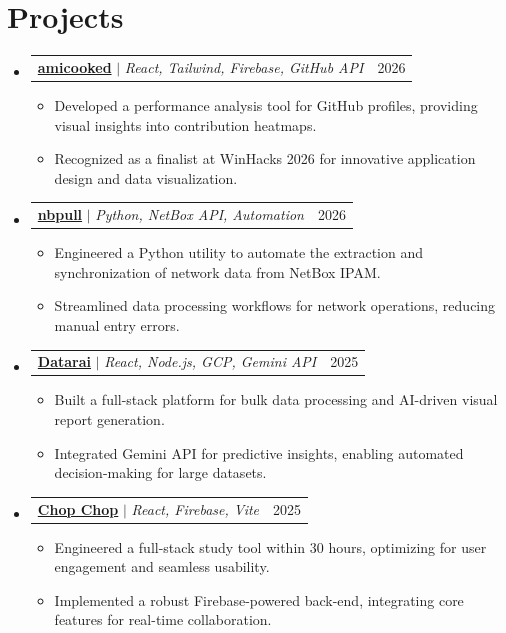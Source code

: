 \documentclass[letterpaper,11pt]{article}
\makeatletter
\newcommand{\resumeItem}[1]{
  \item\small{
    {#1 \vspace{-2pt}}
  }
}
\newcommand{\resumeProjectHeading}[2]{
    \item
    \begin{tabular*}{0.97\textwidth}{l@{\extracolsep{\fill}}r}
      \small#1 & #2 \\
    \end{tabular*}\vspace{-7pt}
}
\newcommand{\resumeSubHeadingListStart}{\begin{itemize}[leftmargin=0.15in, label={}]}
\newcommand{\resumeSubHeadingListEnd}{\end{itemize}\vspace{-8pt}}
\newcommand{\resumeItemListStart}{\begin{itemize}\vspace{-2pt}}
\newcommand{\resumeItemListEnd}{\end{itemize}\vspace{-8pt}}
\makeatother
\begin{document}
\section{Projects}
    \resumeSubHeadingListStart
        \resumeProjectHeading{\href{https://github.com/Champion2005/amicooked}{{\textbf{amicooked}}} $|$ \emph{React, Tailwind, Firebase, GitHub API}}{2026}
            \resumeItemListStart
            \resumeItem{Developed a performance analysis tool for GitHub profiles, providing visual insights into contribution heatmaps.}
            \resumeItem{Recognized as a finalist at WinHacks 2026 for innovative application design and data visualization.}
            \resumeItemListEnd

        \resumeProjectHeading{\href{https://github.com/Champion2005/nbpull}{{\textbf{nbpull}}} $|$ \emph{Python, NetBox API, Automation}}{2026}
            \resumeItemListStart
            \resumeItem{Engineered a Python utility to automate the extraction and synchronization of network data from NetBox IPAM.}
            \resumeItem{Streamlined data processing workflows for network operations, reducing manual entry errors.}
            \resumeItemListEnd

        \resumeProjectHeading{\href{https://prototype.datarai.com}{{\textbf{Datarai}}} $|$ \emph{React, Node.js, GCP, Gemini API}}{2025}
            \resumeItemListStart
            \resumeItem{Built a full-stack platform for bulk data processing and AI-driven visual report generation.}
            \resumeItem{Integrated Gemini API for predictive insights, enabling automated decision-making for large datasets.}
            \resumeItemListEnd

        \resumeProjectHeading{\href{https://github.com/Kataray/Winhacks2025}{{\textbf{Chop Chop}}} $|$ \emph{React, Firebase, Vite}}{2025}
            \resumeItemListStart
            \resumeItem{Engineered a full-stack study tool within 30 hours, optimizing for user engagement and seamless usability.}
            \resumeItem{Implemented a robust Firebase-powered back-end, integrating core features for real-time collaboration.}
            \resumeItemListEnd
    \resumeSubHeadingListEnd
\end{document}
